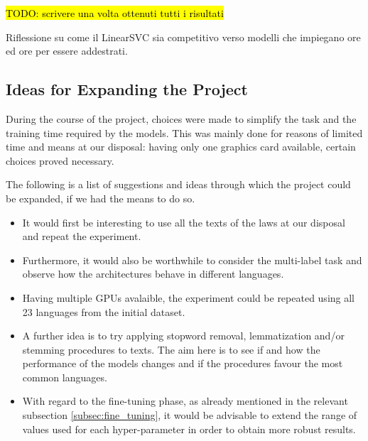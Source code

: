 \documentclass[letterpaper,11pt]{article}
\begin{document}
\hl{TODO: scrivere una volta ottenuti tutti i risultati}

Riflessione su come il LinearSVC sia competitivo verso modelli che impiegano ore ed ore per essere addestrati.

\subsection{Ideas for Expanding the Project}

During the course of the project, choices were made to simplify the task and the training time required by the models. This was mainly done for reasons of limited time and means at our disposal: having only one graphics card available, certain choices proved necessary.

The following is a list of suggestions and ideas through which the project could be expanded, if we had the means to do so.

\begin{itemize}
  \item It would first be interesting to use all the texts of the laws at our disposal and repeat the experiment.
  \item Furthermore, it would also be worthwhile to consider the multi-label task and observe how the architectures behave in different languages.
  \item Having multiple GPUs avalaible, the experiment could be repeated using all 23 languages from the initial dataset.
  \item A further idea is to try applying stopword removal, lemmatization and/or stemming procedures to texts. The aim here is to see if and how the performance of the models changes and if the procedures favour the most common languages.
  \item With regard to the fine-tuning phase, as already mentioned in the relevant subsection \ref{subsec:fine_tuning}, it would be advisable to extend the range of values used for each hyper-parameter in order to obtain more robust results. 
\end{itemize}



\newpage



\end{document}
